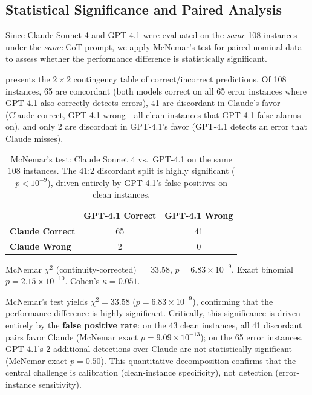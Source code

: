 \documentclass[11pt]{article}
\begin{document}
\subsection{Statistical Significance and Paired Analysis}
\label{sec:analysis:significance}

Since Claude Sonnet 4 and GPT-4.1 were evaluated on the \emph{same} 108 instances under the \emph{same} CoT prompt, we apply McNemar's test for paired nominal data~\citep{mcnemar1947} to assess whether the performance difference is statistically significant.

 presents the $2 \times 2$ contingency table of correct/incorrect predictions.
Of 108 instances, 65 are concordant (both models correct on all 65 error instances where GPT-4.1 also correctly detects errors), 41 are discordant in Claude's favor (Claude correct, GPT-4.1 wrong---all clean instances that GPT-4.1 false-alarms on), and only 2 are discordant in GPT-4.1's favor (GPT-4.1 detects an error that Claude misses).

\begin{table}[t]
\centering
\small
\caption{McNemar's test: Claude Sonnet 4 vs.\ GPT-4.1 on the same 108 instances.
The 41:2 discordant split is highly significant ($p < 10^{-9}$), driven entirely by GPT-4.1's false positives on clean instances.}
\label{tab:mcnemar}
\begin{tabular}{lcc}
\toprule
 & \textbf{GPT-4.1 Correct} & \textbf{GPT-4.1 Wrong} \\
\midrule
\textbf{Claude Correct} & 65 & 41 \\
\textbf{Claude Wrong} & 2 & 0 \\
\bottomrule
\end{tabular}
\vspace{4pt}

\raggedright\scriptsize
McNemar $\chi^2$ (continuity-corrected) $= 33.58$, $p = 6.83 \times 10^{-9}$.
Exact binomial $p = 2.15 \times 10^{-10}$.
Cohen's $\kappa = 0.051$.
\end{table}

McNemar's test yields $\chi^2 = 33.58$ ($p = 6.83 \times 10^{-9}$), confirming that the performance difference is highly significant.
Critically, this significance is driven entirely by the \textbf{false positive rate}:
on the 43 clean instances, all 41 discordant pairs favor Claude (McNemar exact $p = 9.09 \times 10^{-13}$);
on the 65 error instances, GPT-4.1's 2 additional detections over Claude are not statistically significant (McNemar exact $p = 0.50$).
This quantitative decomposition confirms that the central challenge is calibration (clean-instance specificity), not detection (error-instance sensitivity).
\end{document}
